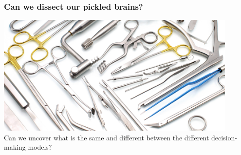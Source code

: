 \begin{frame}
\frametitle{Can we dissect our pickled brains?}

\begin{center}
\includegraphics[width=0.9\textwidth]{./images/surgical_instruments}
\\
\vspace{3mm}
\small{Can we uncover what is the same and different between the different decision-making models?}
\end{center}   

\end{frame}